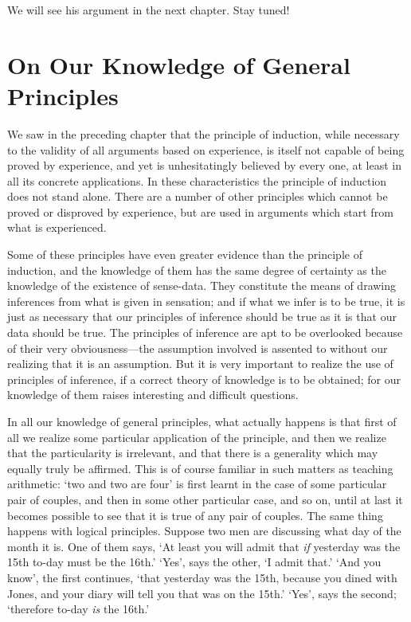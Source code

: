 \documentclass[oneside,letterpaper,12pt]{book}
\begin{document}
We will see his argument in the next chapter. Stay tuned!

\hypertarget{chapter-vii.-on-our-knowledge-of-general-principles}{%
\chapter{On Our Knowledge of General Principles}\label{chapter-vii.-on-our-knowledge-of-general-principles}}

We saw in the preceding chapter that the principle of induction, while
necessary to the validity of all arguments based on experience, is
itself not capable of being proved by experience, and yet is
unhesitatingly believed by every one, at least in all its concrete
applications. In these characteristics the principle of induction does
not stand alone. There are a number of other principles which cannot be
proved or disproved by experience, but are used in arguments which start
from what is experienced.

Some of these principles have even greater evidence than the principle
of induction, and the knowledge of them has the same degree of certainty
as the knowledge of the existence of sense-data. They constitute the
means of drawing inferences from what is given in sensation; and if what
we infer is to be true, it is just as necessary that our principles of
inference should be true as it is that our data should be true. The
principles of inference are apt to be overlooked because of their very
obviousness---the assumption involved is assented to without our
realizing that it is an assumption. But it is very important to realize
the use of principles of inference, if a correct theory of knowledge is
to be obtained; for our knowledge of them raises interesting and
difficult questions.

In all our knowledge of general principles, what actually happens is
that first of all we realize some particular application of the
principle, and then we realize that the particularity is irrelevant, and
that there is a generality which may equally truly be affirmed. This is
of course familiar in such matters as teaching arithmetic:
`two and two are four' is first learnt
in the case of some particular pair of couples, and then in some other
particular case, and so on, until at last it becomes possible to see
that it is true of any pair of couples. The same thing happens with
logical principles. Suppose two men are discussing what day of the month
it is. One of them says, `At least you will admit that
\emph{if} yesterday was the 15th to-day must be the
16th.' `Yes', says the
other, `I admit that.'
`And you know', the first continues,
`that yesterday was the 15th, because you dined with
Jones, and your diary will tell you that was on the
15th.' `Yes', says the
second; `therefore to-day \emph{is} the
16th.'
\end{document}
